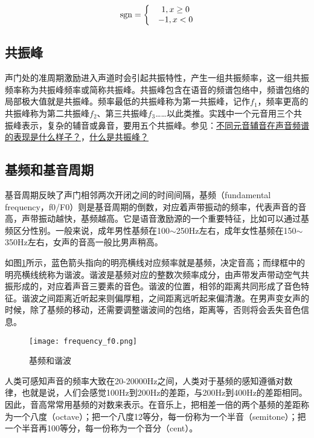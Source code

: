 \documentclass[cn,10pt,math=newtx,citestyle=gb7714-2015,bibstyle=gb7714-2015]{elegantbook}
\begin{document}
\begin{equation}
  {\rm sgn}=\left\{\begin{matrix}
    & 1,x \geq 0 \\ 
    & -1,x<0
   \end{matrix}\right.
\end{equation}

\subsection{共振峰}

声门处的准周期激励进入声道时会引起共振特性，产生一组共振频率，这一组共振频率称为共振峰频率或简称共振峰。共振峰包含在语音的频谱包络中，频谱包络的局部极大值就是共振峰。频率最低的共振峰称为第一共振峰，记作$f_1$，频率更高的共振峰称为第二共振峰$f_2$、第三共振峰$f_3$……以此类推。实践中一个元音用三个共振峰表示，复杂的辅音或鼻音，要用五个共振峰。参见：\href{https://www.zhihu.com/question/27126800/answer/35376174}{不同元音辅音在声音频谱的表现是什么样子？}，\href{https://www.zhihu.com/question/24190826/answer/280149476}{什么是共振峰？}

\subsection{基频和基音周期}

基音周期反映了声门相邻两次开闭之间的时间间隔，基频（fundamental frequency，f0/F0）则是基音周期的倒数，对应着声带振动的频率，代表声音的音高，声带振动越快，基频越高。它是语音激励源的一个重要特征，比如可以通过基频区分性别。一般来说，成年男性基频在100$\sim$250Hz左右，成年女性基频在150$\sim$350Hz左右，女声的音高一般比男声稍高。

如图\ref{fig:frequency_f0}所示，蓝色箭头指向的明亮横线对应频率就是基频，决定音高；而绿框中的明亮横线统称为谐波。谐波是基频对应的整数次频率成分，由声带发声带动空气共振形成的，对应着声音三要素的音色。谐波的位置，相邻的距离共同形成了音色特征。谐波之间距离近听起来则偏厚粗，之间距离远听起来偏清澈。在男声变女声的时候，除了基频的移动，还需要调整谐波间的包络，距离等，否则将会丢失音色信息。

\begin{figure}[htbp]
  \centering
  \texttt{[image: frequency\_f0.png]}
  \caption{基频和谐波} \label{fig:frequency_f0}
\end{figure}

人类可感知声音的频率大致在20-20000Hz之间，人类对于基频的感知遵循对数律，也就是说，人们会感觉100Hz到200Hz的差距，与200Hz到400Hz的差距相同。因此，音高常常用基频的对数来表示。在音乐上，把相差一倍的两个基频的差距称为一个八度（octave）；把一个八度12等分，每一份称为一个半音（semitone）；把一个半音再100等分，每一份称为一个音分（cent）。
\end{document}
